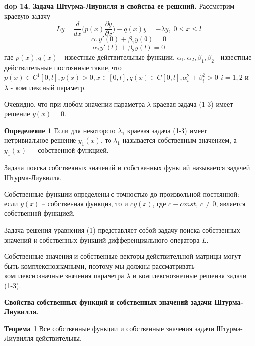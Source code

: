 \textbf{\LARGE dop 14. Задача Штуpма-Лиувилля и свойства ее pешений.}
Рассмотрим краевую задачу
\begin{equation}
    Ly = \frac{d}{dx} \Big( p(x) \frac{\partial y}{\partial x} \Big) - q(x) y = - \lambda y, \; 0\leq x \leq l
\end{equation}
\begin{equation}
    \alpha_1 y'(0)+\beta_1 y(0)=0
\end{equation}
\begin{equation}
    \alpha_2 y'(l)+\beta_2 y(l)=0
\end{equation}
где $p(x), q(x)$ - известные действительные функции, $\alpha_1, \alpha_2, \beta_1, \beta_2$ - известные действительные постоянные такие, что $p(x)\in C^1[0,l], p(x)>0, x\in[0,l], q(x)\in C[0,l], \alpha_i^2+\beta_i^2>0, i=1,2$ и $\lambda$ - комплексный параметр.

Очевидно, что при любом значении параметра $\lambda$ краевая задача (1-3) имеет решение $y(x) = 0$.

\textbf{Определение 1} Если для некоторого $\lambda_1$ краевая задача (1-3) имеет нетривиальное решение $y_1(x)$, то $\lambda_1$ называется собственным значением, а $y_1(x)$ --- собственной функцией.

Задача поиска собственных значений и собственных функций называется задачей Штурма-Лиувилля.

Собственные функции определены с точностью до произвольной постоянной: если $y(x)$ – собственная функция, то и $cy(x)$, где $c-const, \, c \neq 0$, является собственной функцией.

Задача решения уравнения (1) представляет собой задачу поиска собственных значений и собственных функций дифференциального
оператора $L$.

Собственные значения и собственные векторы действительной матрицы могут быть комплекснозначными, поэтому мы должны рассматривать комплекснозначные значения параметра $\lambda$ и комплекснозначные решения задачи (1-3).

\textbf{Свойства собственных функций и собственных значений задачи Штурма-Лиувилля.}

\textbf{Теорема 1} Все собственные функции и собственные значения
задачи Штурма-Лиувилля действительны.

